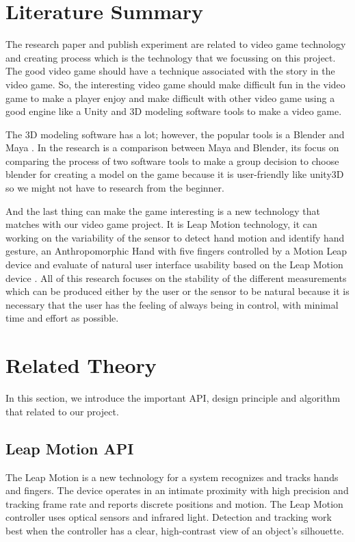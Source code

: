 \documentclass[journal]{IEEEtran}										    %
\begin{document}
    \section{Literature Summary}                                            %
        The research paper and publish experiment are related to video game 
        technology and creating process which is the technology that we 
        focussing on this project. The good video game should have a technique 
        associated with the story in the video game. So, the interesting 
        video game should make difficult fun in the video game to make a player 
        enjoy and make difficult with other video game \cite{TAG5} using a good engine 
        like a Unity and 3D modeling software tools to make a video game.

        The 3D modeling software has a lot; however, the popular tools is a 
        Blender and Maya \cite{TAG4}. In the research is a comparison between Maya 
        and Blender, its focus on comparing the process of two software tools 
        to make a group decision to choose blender for creating a model on 
        the game because it is user-friendly like unity3D so we might not 
        have to research from the beginner.

        And the last thing can make the game interesting is a new technology 
        that matches with our video game project. It is Leap Motion technology, 
        it can working on the variability of the sensor \cite{TAG1} to detect hand motion 
        and identify hand gesture, an Anthropomorphic Hand with five fingers 
        controlled by a Motion Leap device \cite{TAG2} and evaluate of natural user 
        interface usability based on the Leap Motion device \cite{TAG3}. All of this 
        research focuses on the stability of the different measurements which 
        can be produced either by the user or the sensor to be natural because 
        it is necessary that the user has the feeling of always being in control, 
        with minimal time and effort as possible.


        \section{Related Theory}
        In this section, we introduce the important API, design principle and algorithm
        that related to our project.

            \subsection{Leap Motion API}
                The Leap Motion is a new technology for a system recognizes 
                and tracks hands and fingers. The device operates in an intimate 
                proximity with high precision and tracking frame rate and reports 
                discrete positions and motion. The Leap Motion controller uses 
                optical sensors and infrared light. Detection and tracking work 
                best when the controller has a clear, high-contrast view of an 
                object's silhouette.
\end{document}
